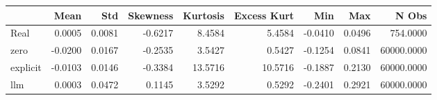 \begin{tabular}{lrrrrrrrr}
\toprule
 & Mean & Std & Skewness & Kurtosis & Excess Kurt & Min & Max & N Obs \\
\midrule
Real & 0.0005 & 0.0081 & -0.6217 & 8.4584 & 5.4584 & -0.0410 & 0.0496 & 754.0000 \\
zero & -0.0200 & 0.0167 & -0.2535 & 3.5427 & 0.5427 & -0.1254 & 0.0841 & 60000.0000 \\
explicit & -0.0103 & 0.0146 & -0.3384 & 13.5716 & 10.5716 & -0.1887 & 0.2130 & 60000.0000 \\
llm & 0.0003 & 0.0472 & 0.1145 & 3.5292 & 0.5292 & -0.2401 & 0.2921 & 60000.0000 \\
\bottomrule
\end{tabular}

